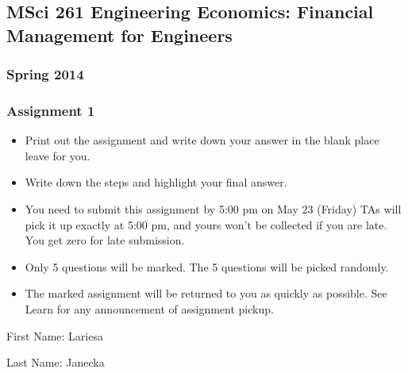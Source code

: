 \documentclass[12pt]{article}
\begin{document}
\begin{centering}	
\subsection*{MSci 261 Engineering Economics: Financial Management for Engineers}
\subsubsection*{Spring 2014}
\subsubsection*{Assignment 1}
\end{centering}
\begin{itemize} 
\item Print out the assignment and write down your answer in the blank place leave for you.
\item Write down the steps and highlight your final answer.
\item You need to submit this assignment by 5:00 pm on May 23 (Friday) TAs will pick it up exactly at 5:00 pm, and yours won’t be collected if you are late. You get zero for late submission.
\item Only 5 questions will be marked. The 5 questions will be picked randomly.
\item The marked assignment will be returned to you as quickly as possible. See Learn for any announcement of assignment pickup.	
\end{itemize}
First Name: Lariesa

Last Name: Janecka
\end{document}
